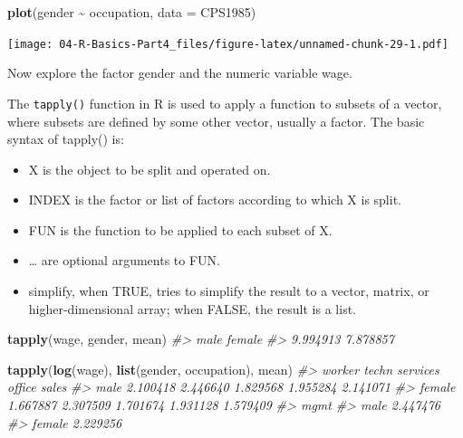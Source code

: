 \documentclass[
]{book}
\newenvironment{Shaded}{\begin{snugshade}}{\end{snugshade}}
\newcommand{\AttributeTok}[1]{\textcolor[rgb]{0.13,0.29,0.53}{#1}}
\newcommand{\CommentTok}[1]{\textcolor[rgb]{0.56,0.35,0.01}{\textit{#1}}}
\newcommand{\FunctionTok}[1]{\textcolor[rgb]{0.13,0.29,0.53}{\textbf{#1}}}
\newcommand{\NormalTok}[1]{#1}
\newcommand{\SpecialCharTok}[1]{\textcolor[rgb]{0.81,0.36,0.00}{\textbf{#1}}}
\providecommand{\tightlist}{%
  \setlength{\itemsep}{0pt}\setlength{\parskip}{0pt}}
\begin{document}
\begin{Shaded}
\begin{Highlighting}[]
\FunctionTok{plot}\NormalTok{(gender }\SpecialCharTok{\textasciitilde{}}\NormalTok{ occupation, }\AttributeTok{data =}\NormalTok{ CPS1985)}
\end{Highlighting}
\end{Shaded}

\texttt{[image: 04-R-Basics-Part4\_files/figure-latex/unnamed-chunk-29-1.pdf]}

Now explore the factor gender and the numeric variable wage.

The \texttt{tapply()} function in R is used to apply a function to subsets of a vector, where subsets are defined by some other vector, usually a factor. The basic syntax of tapply() is:

\begin{itemize}
\tightlist
\item
  X is the object to be split and operated on.
\item
  INDEX is the factor or list of factors according to which X is split.
\item
  FUN is the function to be applied to each subset of X.
\item
  \ldots{} are optional arguments to FUN.
\item
  simplify, when TRUE, tries to simplify the result to a vector, matrix, or higher-dimensional array; when FALSE, the result is a list.
\end{itemize}

\begin{Shaded}
\begin{Highlighting}[]
\FunctionTok{tapply}\NormalTok{(wage, gender, mean)}
\CommentTok{\#\textgreater{}     male   female }
\CommentTok{\#\textgreater{} 9.994913 7.878857}
\end{Highlighting}
\end{Shaded}

\begin{Shaded}
\begin{Highlighting}[]
\FunctionTok{tapply}\NormalTok{(}\FunctionTok{log}\NormalTok{(wage), }\FunctionTok{list}\NormalTok{(gender, occupation), mean)}
\CommentTok{\#\textgreater{}          worker    techn services   office    sales}
\CommentTok{\#\textgreater{} male   2.100418 2.446640 1.829568 1.955284 2.141071}
\CommentTok{\#\textgreater{} female 1.667887 2.307509 1.701674 1.931128 1.579409}
\CommentTok{\#\textgreater{}            mgmt}
\CommentTok{\#\textgreater{} male   2.447476}
\CommentTok{\#\textgreater{} female 2.229256}
\end{Highlighting}
\end{Shaded}
\end{document}
